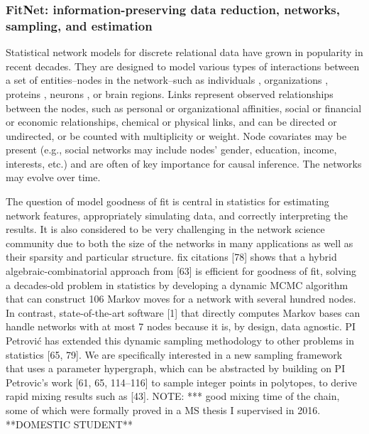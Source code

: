 \documentclass[11pt]{NSFamsart}
\begin{document}
\subsubsection*{FitNet: information-preserving data reduction,  networks, sampling, and estimation} 
 Statistical network models for discrete relational data  have grown in popularity in recent decades. They are designed to model various types of interactions between a set of entities--nodes in the network--such as  individuals \cite{}, organizations \cite{}, proteins \cite{}, neurons \cite{}, or brain regions\cite{}. Links represent observed relationships between the nodes, such as personal or organizational affinities, social or financial or economic relationships, chemical or physical links, and can be directed or undirected, or be counted with multiplicity or weight. Node covariates may be present (e.g., social networks may include nodes’ gender, education, income, interests, etc.) and are often of key importance for causal inference. The networks may evolve over time.


The question of model goodness of fit is central in statistics for   estimating network features, appropriately simulating data,  and correctly interpreting the results. It is also considered to be very challenging in the network science community due to both the size of the networks in many applications as well as their sparsity and particular structure. 
{\color{magenta}fix citations} [78] shows that a hybrid algebraic-combinatorial approach from [63] is efficient for goodness of fit, solving a decades-old problem in statistics by developing a dynamic MCMC algorithm that can construct 106 Markov moves for a network with several hundred nodes.  In contrast, state-of-the-art software [1] that directly computes Markov bases can handle networks with at most 7 nodes because it is, by design, data agnostic. PI Petrovi\'c has extended this dynamic sampling methodology to other problems in statistics [65, 79].     
    We are specifically interested in a new sampling framework that uses a parameter hypergraph, which can be abstracted by building on PI Petrovic’s work [61, 65, 114–116] to sample integer points in polytopes, to derive rapid mixing results such as [43]. 
NOTE:  *** good mixing time of the chain, some of which were formally proved in a MS thesis I supervised in 2016. **DOMESTIC STUDENT**
\end{document}
